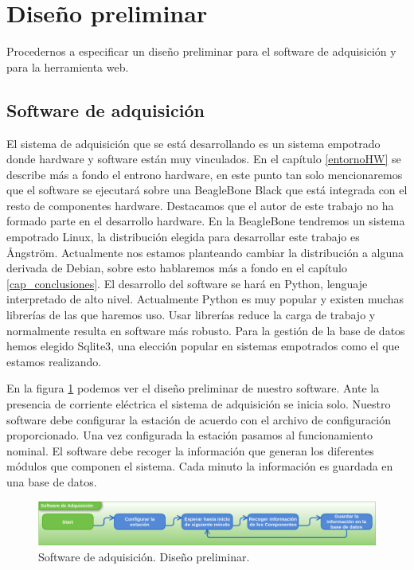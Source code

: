 \section{Diseño preliminar}
	Procedernos a especificar un diseño preliminar para el software de adquisición y para la herramienta web.
	\subsection{Software de adquisición}
		El sistema de adquisición que se está desarrollando es un sistema empotrado donde hardware y software están muy vinculados. En el
		capítulo \ref{entornoHW} se describe más a fondo el entrono hardware, en este punto tan solo mencionaremos que el software se
		ejecutará sobre una BeagleBone Black\cite{Beagle} que está integrada con el resto de componentes hardware. Destacamos que el autor de
		este trabajo no ha formado parte en el desarrollo hardware. En la BeagleBone tendremos un sistema empotrado Linux, la distribución
		elegida para desarrollar este trabajo es Ångström. Actualmente nos estamos planteando cambiar la distribución a alguna derivada de
		Debian, sobre esto hablaremos más a fondo en el capítulo \ref{cap_conclusiones}. El desarrollo del software se hará en
		Python\cite{Python}, lenguaje interpretado de alto nivel. Actualmente Python es muy popular y existen muchas librerías de las que
		haremos uso. Usar librerías reduce la carga de trabajo y normalmente resulta en software más robusto. Para la gestión de la base de
		datos hemos elegido Sqlite3\cite{Sqlite}, una elección popular en sistemas empotrados como el que estamos realizando. 
		\par
		En la figura \ref{fig:soft_control_preliminar} podemos ver el diseño preliminar de nuestro software. Ante la presencia de corriente
		eléctrica el sistema de adquisición se inicia solo. Nuestro software debe configurar la estación de acuerdo con el archivo de
		configuración proporcionado. Una vez configurada la estación pasamos al funcionamiento nominal. El software debe recoger la
		información que generan los diferentes módulos que componen el sistema. Cada minuto la información es guardada en una base de datos.
		\begin{figure}[h]
			\centering
			\includegraphics[keepaspectratio, width=1\textwidth]{./img/soft_control_preliminar.png}
			\caption{Software de adquisición. Diseño preliminar.}
			\label{fig:soft_control_preliminar}
		\end{figure}
